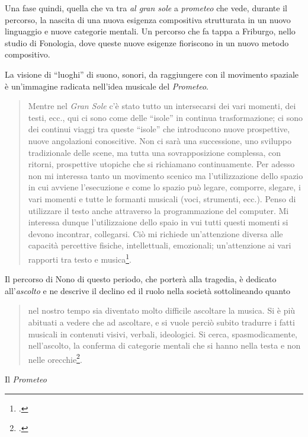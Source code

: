 Una fase quindi, quella che va tra \emph{al gran sole} a \emph{prometeo} che vede, durante il percorso, la nascita di una nuova esigenza compositiva strutturata in un nuovo linguaggio e nuove categorie mentali. Un percorso che fa tappa a Friburgo, nello studio di Fonologia, dove queste nuove esigenze fioriscono in un nuovo metodo compositivo.

La visione di “luoghi” di suono, sonori, da raggiungere con il movimento spaziale è un'immagine radicata nell'idea musicale del \emph{Prometeo}.

\begin{quote}
	Mentre nel \emph{Gran Sole} c'è stato tutto un intersecarsi dei vari momenti, dei testi, ecc., qui ci sono come delle “isole” in continua trasformazione; ci sono dei continui viaggi tra queste “isole” che introducono nuove prospettive, nuove angolazioni conoscitive. Non ci sarà una successione, uno sviluppo tradizionale delle scene, ma tutta una sovrapposizione complessa, con ritorni, prospettive utopiche che si richiamano continuamente. Per adesso non mi interessa tanto un movimento scenico ma l'utilizzazione dello spazio in cui avviene l'esecuzione e come lo spazio può legare, comporre, slegare, i vari momenti e tutte le formanti musicali (voci, strumenti, ecc.). Penso di utilizzare il testo anche attraverso la programmazione del computer. Mi interessa dunque l'utilizzaione dello spaio in vui tutti questi momenti si devono incontrar, collegarsi. Ciò mi richiede un'attenzione diversa alle capacità percettive fisiche, intellettuali, emozionali; un'attenzione ai vari rapporti tra testo e musica\footcite[vol. II p. 245, \emph{Intervista di Renato Garavaglia} 1979-80]{nono:scrcol}.
\end{quote} 

Il percorso di Nono di questo periodo, che porterà alla tragedia, è dedicato all'\emph{ascolto} e ne descrive il declino ed il ruolo nella società sottolineando quanto

\begin{quote}
nel nostro tempo sia diventato molto difficile ascoltare la musica. Si è più abituati a vedere che ad ascoltare, e si vuole perciò subito tradurre i fatti musicali in contenuti visivi, verbali, ideologici. Si cerca, spasmodicamente, nell'ascolto, la conferma di categorie mentali che si hanno nella testa e non nelle orecchie\footcite[vol. II p. 259, \emph{Intervista di Dino Villatico} 1981]{nono:scrcol}.  
\end{quote} 

Il \emph{Prometeo}


